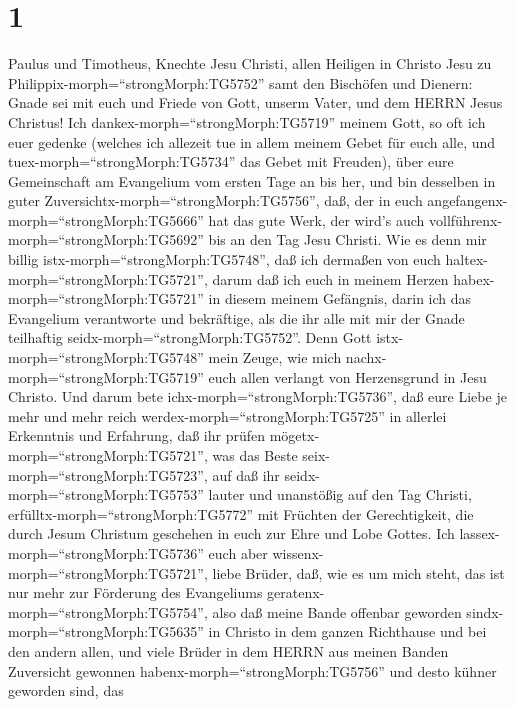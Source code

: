 \hypertarget{section}{%
\section{1}\label{section}}

 Paulus und Timotheus, Knechte Jesu Christi, allen Heiligen
in Christo Jesu zu Philippix-morph=``strongMorph:TG5752'' samt den
Bischöfen und Dienern:  Gnade sei mit euch und Friede von
Gott, unserm Vater, und dem HERRN Jesus Christus!  Ich
dankex-morph=``strongMorph:TG5719'' meinem Gott, so oft ich euer gedenke
 (welches ich allezeit tue in allem meinem Gebet für euch
alle, und tuex-morph=``strongMorph:TG5734'' das Gebet mit Freuden),
 über eure Gemeinschaft am Evangelium vom ersten Tage an bis
her,  und bin desselben in guter
Zuversichtx-morph=``strongMorph:TG5756'', daß, der in euch
angefangenx-morph=``strongMorph:TG5666'' hat das gute Werk, der wird's
auch vollführenx-morph=``strongMorph:TG5692'' bis an den Tag Jesu
Christi.  Wie es denn mir billig
istx-morph=``strongMorph:TG5748'', daß ich dermaßen von euch
haltex-morph=``strongMorph:TG5721'', darum daß ich euch in meinem Herzen
habex-morph=``strongMorph:TG5721'' in diesem meinem Gefängnis, darin ich
das Evangelium verantworte und bekräftige, als die ihr alle mit mir der
Gnade teilhaftig seidx-morph=``strongMorph:TG5752''.  Denn
Gott istx-morph=``strongMorph:TG5748'' mein Zeuge, wie mich
nachx-morph=``strongMorph:TG5719'' euch allen verlangt von Herzensgrund
in Jesu Christo.  Und darum bete
ichx-morph=``strongMorph:TG5736'', daß eure Liebe je mehr und mehr reich
werdex-morph=``strongMorph:TG5725'' in allerlei Erkenntnis und
Erfahrung,  daß ihr prüfen
mögetx-morph=``strongMorph:TG5721'', was das Beste
seix-morph=``strongMorph:TG5723'', auf daß ihr
seidx-morph=``strongMorph:TG5753'' lauter und unanstößig auf den Tag
Christi,  erfülltx-morph=``strongMorph:TG5772'' mit
Früchten der Gerechtigkeit, die durch Jesum Christum geschehen in euch
zur Ehre und Lobe Gottes.  Ich
lassex-morph=``strongMorph:TG5736'' euch aber
wissenx-morph=``strongMorph:TG5721'', liebe Brüder, daß, wie es um mich
steht, das ist nur mehr zur Förderung des Evangeliums
geratenx-morph=``strongMorph:TG5754'',  also daß meine
Bande offenbar geworden sindx-morph=``strongMorph:TG5635'' in Christo in
dem ganzen Richthause und bei den andern allen,  und viele
Brüder in dem HERRN aus meinen Banden Zuversicht gewonnen
habenx-morph=``strongMorph:TG5756'' und desto kühner geworden sind, das
